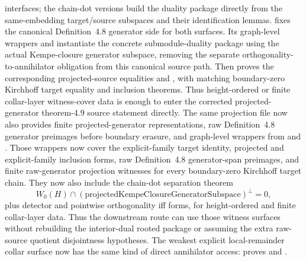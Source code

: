 \documentclass[11pt]{article}
\begin{document}
\begin{itemize}
interfaces; the chain-dot versions build the duality package directly from the
same-embedding target/source subspaces and their identification lemmas.
 fixes the canonical Definition~4.8
generator side for both surfaces.  Its graph-level wrappers
and
instantiate the concrete submodule-duality package using the actual
Kempe-closure generator subspace, removing the separate
orthogonality-to-annihilator obligation from this canonical source path.  Then
 proves the corresponding projected-source
equalities
and
,
with matching boundary-zero Kirchhoff target equality and inclusion theorems.
Thus height-ordered or finite collar-layer witness-cover data is enough to enter
the corrected projected-generator theorem-4.9 source statement directly.  The
same projection file now also provides finite projected-generator
representations, raw Definition~4.8 generator preimages before boundary erasure,
and graph-level wrappers from
 and
.  Those wrappers now
cover the explicit-family target identity, projected and explicit-family
inclusion forms, raw Definition~4.8 generator-span preimages, and finite
raw-generator projection witnesses for every boundary-zero Kirchhoff target
chain.  They now also include the chain-dot separation theorem
\[
  W_0(H) \cap (\mathrm{projectedKempeClosureGeneratorSubspace})^\perp
  = 0,
\]
plus detector and pointwise orthogonality iff forms, for height-ordered and
finite collar-layer data.  Thus the downstream route can use those witness
surfaces without rebuilding the interior-dual rooted package or assuming the
extra raw-source quotient disjointness hypotheses.  The weakest explicit
local-remainder collar surface now has the same kind of direct annihilator
access:  proves
and
.

\end{itemize}
\end{document}
